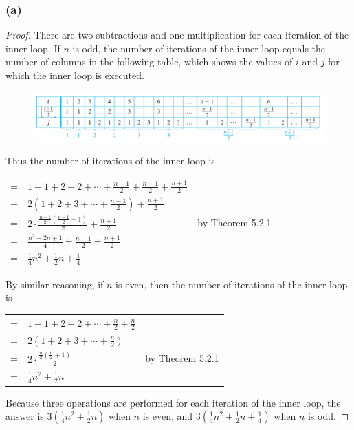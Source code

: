 \documentclass[14pt]{extarticle}
\newcommand{\dps}{\displaystyle}
\newcommand{\cy}{\color{cyan}}
\begin{document}
\subsubsection{(a)}
\begin{proof}
    There are two subtractions and one multiplication for each iteration of the inner loop. If \(n\) is odd, the number of
    iterations of the inner loop equals the number of columns in the following table, which shows the values of \(i\) and \(j\)
    for which the inner loop is executed.

    \begin{figure}[ht!]
        \centering
        \includegraphics[scale=0.45]{../images/11.3.17.a.png}
    \end{figure}

    Thus the number of iterations of the inner loop is

    \begin{tabular}{rll}
        = & \(\dps 1+1+2+2+\cdots+\frac{n-1}{2}+\frac{n-1}{2}+\frac{n+1}{2}\)                    & {\cy }                 \\
        = & \(\dps 2\left(1+2+3+\cdots+\frac{n-1}{2}\right)+\frac{n+1}{2}\)                      & {\cy }                 \\
        = & \(\dps 2 \cdot \frac{\frac{n-1}{2}\left(\frac{n-1}{2}+1\right)}{2} + \frac{n+1}{2}\) & {\cy by Theorem 5.2.1} \\
        = & \(\dps \frac{n^2-2n+1}{4} + \frac{n-1}{2} + \frac{n+1}{2}\)                          & {\cy }                 \\
        = & \(\dps \frac{1}{4}n^2+\frac{1}{2}n+\frac{1}{4}\)                                     & {\cy }
    \end{tabular}

    By similar reasoning, if \(n\) is even, then the number of iterations of the inner loop is

    \begin{tabular}{rll}
        = & \(\dps 1+1+2+2+\cdots+\frac{n}{2}+\frac{n}{2}\)                     & {\cy }                 \\
        = & \(\dps 2\left(1+2+3+\cdots+\frac{n}{2}\right)\)                     & {\cy }                 \\
        = & \(\dps 2 \cdot \frac{\frac{n}{2}\left(\frac{n}{2} + 1 \right)}{2}\) & {\cy by Theorem 5.2.1} \\
        = & \(\dps \frac{1}{4}n^2+\frac{1}{2}n\)                                & {\cy }
    \end{tabular}

    Because three operations are performed for each iteration of the inner loop, the answer is \(\dps 3 \left(\frac{1}{4}n^2+
    \frac{1}{2}n\right)\) when \(n\) is even, and \(\dps 3 \left(\frac{1}{4}n^2+\frac{1}{2}n+\frac{1}{4}\right)\) when
    \(n\) is odd.
\end{proof}
\end{document}
